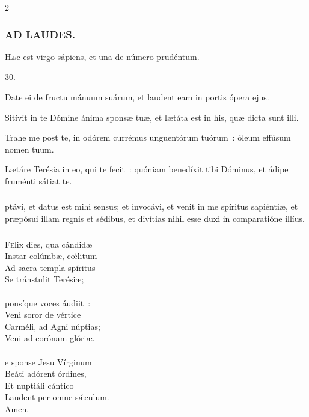 \documentclass[9pt,twoside]{extarticle}
\begin{document}
\begin{multicols}{2}
{\subsubsection*{\center \textsc{AD LAUDES.}}
\begin{center}\end{center}
\lettrine{H}æc est virgo sápiens, et una de número prudéntum. 

\begin{tightlist}{}
\item {} 30.
\item {} Date ei de fructu mánuum suárum, et laudent eam in portis ópera ejus.
\item {} Sitívit in te Dómine ánima sponsæ tuæ, et lætáta est in his, quæ dicta sunt illi.
\item {} Trahe me post te, in odórem currémus unguentórum tuórum~: óleum effúsum nomen tuum.
\item {} Lætáre Terésia in eo, qui te fecit~: quóniam benedíxit tibi Dóminus, et ádipe fruménti sátiat te.
\end{tightlist}

\subsubsection*{\center {}}
ptávi, et datus est mihi sensus; et invocávi, et venit in me spíritus sapiéntiæ, et præpósui illam regnis et sédibus, et divítias nihil esse duxi in comparatióne illíus.

\subsubsection*{\center {}}
\begin{center}\end{center}
\lettrine{F}elix dies, qua cándidæ\\
Instar colúmbæ, cœ́litum\\
Ad sacra templa spíritus\\
Se tránstulit Terésiæ;\\
\\
ponsíque voces áudiit~:\\
Veni soror de vértice\\
Carméli, ad Agni núptias;\\
Veni ad corónam glóriæ.\\
\\
e sponse Jesu Vírginum\\
Beáti adórent órdines,\\
Et nuptiáli cántico\\
Laudent per omne sǽculum.\\
Amen.

}
\end{multicols}
\end{document}
